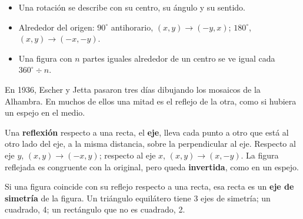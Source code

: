 \documentclass[11pt]{article}
\begin{document}
\begin{resumen}
\begin{itemize}
  \item Una rotación se describe con su centro, su ángulo y su sentido.
  \item Alrededor del origen: $90^\circ$ antihorario, $(x, y) \to (-y, x)$; $180^\circ$,
        $(x, y) \to (-x, -y)$.
  \item Una figura con $n$ partes iguales alrededor de un centro se ve igual cada
        $360^\circ \div n$.
\end{itemize}
\end{resumen}

\label{tema:reflexiones}

\begin{hilo}
En 1936, Escher y Jetta pasaron tres días dibujando los mosaicos de la Alhambra. En muchos de
ellos una mitad es el reflejo de la otra, como si hubiera un espejo en el medio.
\end{hilo}

\begin{definicion}[Reflexión]
Una \textbf{reflexión} respecto a una recta, el \textbf{eje}, lleva cada punto a otro que está al
otro lado del eje, a la misma distancia, sobre la perpendicular al eje. Respecto al eje $y$,
$(x, y) \to (-x, y)$; respecto al eje $x$, $(x, y) \to (x, -y)$. La figura reflejada es
congruente con la original, pero queda \textbf{invertida}, como en un espejo.
\end{definicion}

Si una figura coincide con su reflejo respecto a una recta, esa recta es un \textbf{eje de
simetría} de la figura. Un triángulo equilátero tiene 3 ejes de simetría; un cuadrado, 4; un
rectángulo que no es cuadrado, 2.

\begin{center}
\end{center}
\end{document}
